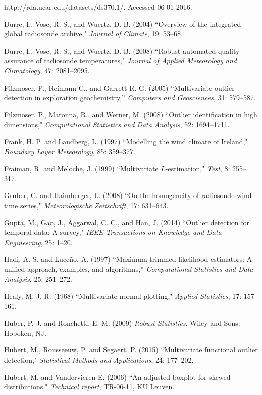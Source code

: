 \documentclass[12pt]{article}
\def\refhg{\hangindent=20pt\hangafter=1}
\def\refmark{\par\vskip 2mm\noindent\refhg}
\def\refhg{\hangindent=20pt\hangafter=1}
\def\refmark{\par\vskip 2mm\noindent\refhg}
\begin{document}
\hspace{.1cm}http://rda.ucar.edu/datasets/ds370.1/. Accessed 06 01 2016.

\refmark Durre, I., Vose, R. S., and Wuertz, D. B. (2004) ``Overview of the integrated global radiosonde archive," \emph{Journal of Climate}, 19: 53--68.

\refmark Durre, I., Vose, R. S., and Wuertz, D. B. (2008) ``Robust automated quality assurance of radiosonde temperatures," \emph{Journal of Applied Meteorology and Climatology}, 47:  2081--2095.


\refmark Filzmoser, P.,  Reimann C., and Garrett R. G. (2005) ``Multivariate outlier detection in exploration geochemistry,'' \emph{Computers and Geosciences}, 31: 579--587.

\refmark Filzmoser, P.,  Maronna, R., and  Werner, M. (2008)  ``Outlier identification in high dimensions," \emph{Computational Statistics and Data Analysis}, 52: 1694--1711.

\refmark Frank, H. P. and Landberg, L. (1997) ``Modelling the wind climate of Ireland,"  \emph{Boundary Layer Meteorology}, 85: 359--377.

\refmark Fraiman, R. and Meloche, J. (1999) ``Multivariate $L$-estimation," \emph{Test}, 8: 255--317.

\refmark Gruber, C. and Haimberger, L. (2008) ``On the homogeneity of radiosonde wind time series," \emph{Meteorologische Zeitschrift}, 17: 631--643.

\refmark Gupta, M., Gao, J., Aggarwal, C. C., and Han, J. (2014) ``Outlier detection for temporal data: A survey," \emph{IEEE Transactions on Knowledge and Data Engineering}, 25:  1--20.


\refmark Hadi, A. S. and Luce\~no, A. (1997) ``Maximum trimmed likelihood estimators: A unified approach, examples, and algorithms,'' \emph{Computational Statistics and Data Analysis}, 25: 251--272.

\refmark Healy, M. J. R. (1968) ``Multivariate normal plotting," \emph{Applied Statistics}, 17: 157--161.


\refmark Huber, P. J.  and Ronchetti, E. M. (2009)  \emph{Robust Statistics}.  Wiley and Sons: Hoboken, NJ.


\refmark Hubert, M., Rousseeuw, P. and Segaert, P. (2015) ``Multivariate functional outlier detection," \emph{Statistical Methods and Applications}, 24: 177--202.
\refmark Hubert, M.  and Vandervieren E. (2006) ``An adjusted boxplot for skewed distributions," \emph{Technical report}, TR-06-11, KU Leuven.
\end{document}
